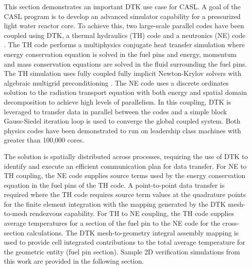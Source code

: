 \documentclass{mc2013}
\begin{document}
\label{sec:examples}

This section demonstrates an important DTK use case for CASL.  A goal
of the CASL program \cite{u.s._department_of_energy_casl_2011} is to
develop an advanced simulator capability for a pressurized light water
reactor core.  To achieve this, two large-scale parallel codes have
been coupled using DTK, a thermal hydraulics (TH) code
\cite{drekar_cfd} and a neutronics (NE) code \cite{denovo_2010}.  The
TH code performs a multiphysics conjugate heat transfer simulation
where energy conservation equation is solved in the fuel pins and
energy, momentum and mass conservation equations are solved in the
fluid surrounding the fuel pins.  The TH simulation uses fully coupled
fully implicit Newton-Krylov solvers with algebraic multigrid
preconditioning \cite{shadid_2006}.  The NE code uses a discrete
ordinates solution to the radiation transport equation with both
energy and spatial domain decomposition to achieve high levels of
parallelism.  In this coupling, DTK is leveraged to transfer data in
parallel between the codes and a simple block Gauss-Siedel iteration
loop is used to converge the global coupled system.  Both physics
codes have been demonstrated to run on leadership class machines with
greater than 100,000 cores.

The solution is spatially distributed across processes, requiring the
use of DTK to identify and execute an efficient communication plan for
data transfer.  For NE to TH coupling, the NE code supplies source
terms used by the energy conservation equation in the fuel pins of the
TH code.  A point-to-point data transfer is required where the TH code
requires source term values at the quadrature points for the finite
element integration with the mapping generated by the DTK mesh-to-mesh
rendezvous capability.  For TH to NE coupling, the TH code supplies
average temperatures for a section of the fuel pin to the NE code for
the cross-section calculations.  The DTK mesh-to-geometry integral
assembly mapping is used to provide cell integrated contributions to
the total average temperature for the geometric entity (fuel pin
section).  Sample 2D verification simulations from this work are
provided in the following section.

\label{subsec:cht}
\end{document}
